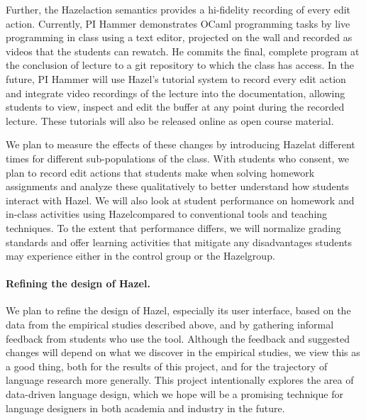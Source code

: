 \documentclass[letterpaper,USenglish]{lipics-v2016}
\newcommand{\Hazel}[0]{\textsf{Hazel}}
\begin{document}
Further, the \Hazel action semantics provides a hi-fidelity recording
of every edit action. Currently, PI Hammer demonstrates OCaml
programming tasks by live programming in class using a text editor,
projected on the wall and recorded as videos that the students can
rewatch.  He commits the final, complete program at the conclusion of
lecture to a git repository to which the class has access.
%
In the future, PI Hammer will use \Hazel's tutorial system to record every edit action
and integrate video recordings of the lecture into the documentation,
allowing students to view, inspect and edit the buffer at any point
during the recorded lecture. These tutorials will also be released online as 
open course material. 

We plan to measure the effects of these changes by introducing \Hazel at
different times for different sub-populations of the class.  With
students who consent, we plan to record edit actions that students
make when solving homework assignments and analyze these qualitatively
to better understand how students interact with \Hazel.  We will also
look at student performance on homework and in-class activities using
\Hazel compared to conventional tools and teaching techniques.  To the
extent that performance differs, we will normalize grading standards and
offer learning activities that mitigate any disadvantages students may
experience either in the control group or the \Hazel group.
%

\paragraph{Refining the design of \Hazel.} 
We plan to refine the design of \Hazel, especially its user interface,
based on the data from the empirical studies described above, and by
gathering informal feedback from students who use the tool.
%
Although the feedback and suggested changes will depend on what we
discover in the empirical studies, we view this as a good thing, both
for the results of this project, and for the trajectory of language
research more generally.  This project intentionally explores the area
of data-driven language design, which we hope will be a promising
technique for language designers in both academia and industry in the
future.







\appendix
\end{document}
